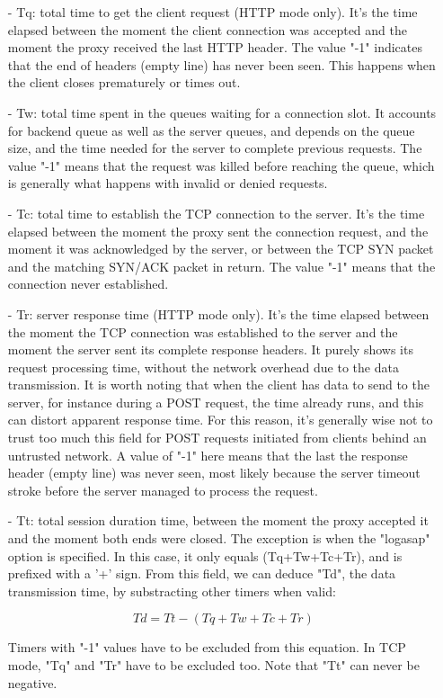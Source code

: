 \begin{itemize}
\item[-]
    Tq: total time to get the client request (HTTP mode only). It's the time
    elapsed between the moment the client connection was accepted and the
    moment the proxy received the last HTTP header. The value "-1" indicates
    that the end of headers (empty line) has never been seen. This happens when
    the client closes prematurely or times out.
\item[-]
    Tw: total time spent in the queues waiting for a connection slot. It
    accounts for backend queue as well as the server queues, and depends on the
    queue size, and the time needed for the server to complete previous
    requests. The value "-1" means that the request was killed before reaching
    the queue, which is generally what happens with invalid or denied requests.
\item[-]
    Tc: total time to establish the TCP connection to the server. It's the time
    elapsed between the moment the proxy sent the connection request, and the
    moment it was acknowledged by the server, or between the TCP SYN packet and
    the matching SYN/ACK packet in return. The value "-1" means that the
    connection never established.
\item[-]
    Tr: server response time (HTTP mode only). It's the time elapsed between
    the moment the TCP connection was established to the server and the moment
    the server sent its complete response headers. It purely shows its request
    processing time, without the network overhead due to the data transmission.
    It is worth noting that when the client has data to send to the server, for
    instance during a POST request, the time already runs, and this can distort
    apparent response time. For this reason, it's generally wise not to trust
    too much this field for POST requests initiated from clients behind an
    untrusted network. A value of "-1" here means that the last the response
    header (empty line) was never seen, most likely because the server timeout
    stroke before the server managed to process the request.
\item[-]
    Tt: total session duration time, between the moment the proxy accepted it
    and the moment both ends were closed. The exception is when the "logasap"
    option is specified. In this case, it only equals (Tq+Tw+Tc+Tr), and is
    prefixed with a '+' sign. From this field, we can deduce "Td", the data
    transmission time, by substracting other timers when valid:

       \[ Td = Tt - (Tq + Tw + Tc + Tr) \]

    Timers with "-1" values have to be excluded from this equation. In TCP
    mode, "Tq" and "Tr" have to be excluded too. Note that "Tt" can never be
    negative.
\end{itemize}

